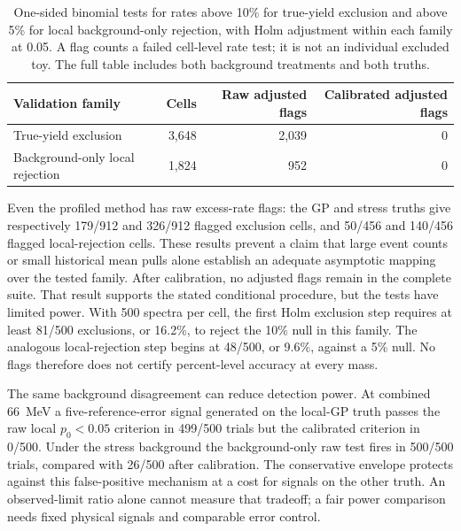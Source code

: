 \begin{table}[H]\centering\small
\begin{tabular}{lrrr}\toprule
Validation family & Cells & Raw adjusted flags & Calibrated adjusted flags\\\midrule
True-yield exclusion & 3,648 & 2,039 & 0\\
Background-only local rejection & 1,824 & 952 & 0\\\bottomrule
\end{tabular}
\caption{One-sided binomial tests for rates above 10\% for true-yield
exclusion and above 5\% for local background-only rejection, with Holm
adjustment within each family at 0.05. A flag counts a failed cell-level
rate test; it is not an individual excluded toy. The full table includes
both background treatments and both truths.}
\label{v5-tab:cal-validation}
\end{table}

Even the profiled method has raw excess-rate flags: the GP and stress
truths give respectively 179/912 and 326/912 flagged exclusion cells,
and 50/456 and 140/456 flagged local-rejection cells. These results
prevent a claim that large event counts or small historical mean pulls
alone establish an adequate asymptotic mapping over the tested family.
After calibration, no adjusted flags remain in the complete suite.
That result supports the stated conditional procedure, but the tests
have limited power. With 500 spectra per cell, the first Holm exclusion
step requires at least 81/500 exclusions, or 16.2\%, to reject the 10\%
null in this family. The analogous local-rejection step begins at
48/500, or 9.6\%, against a 5\% null. No flags therefore does not
certify percent-level accuracy at every mass.

The same background disagreement can reduce detection power. At combined
66~MeV a five-reference-error signal generated on the local-GP truth
passes the raw local $p_0<0.05$ criterion in 499/500 trials but the
calibrated criterion in 0/500. Under the stress background the
background-only raw test fires in 500/500 trials, compared with 26/500
after calibration. The conservative envelope protects against this
false-positive mechanism at a cost for signals on the other truth.
An observed-limit ratio alone cannot measure that tradeoff; a fair power
comparison needs fixed physical signals and comparable error control.


